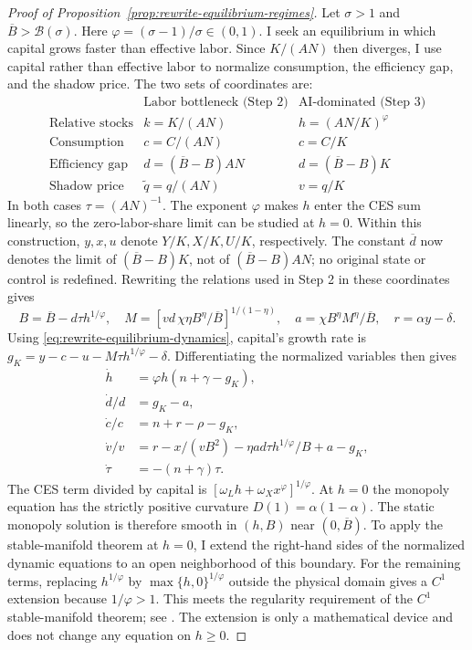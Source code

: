 \begin{proof}[Proof of Proposition~\ref{prop:rewrite-equilibrium-regimes}]
Let $\sigma>1$ and $\overline B>\mathcal B(\sigma)$.
Here $\varphi=(\sigma-1)/\sigma\in(0,1)$.
I seek an equilibrium in which capital grows faster than effective labor.
Since $K/(AN)$ then diverges, I use capital rather than effective labor
to normalize consumption, the efficiency gap, and the shadow price.
The two sets of coordinates are:
\[
\begin{array}{c|cc}
 &\text{Labor bottleneck (Step 2)}&\text{AI-dominated (Step 3)}\\
 \text{Relative stocks}&k=K/(AN)&h=(AN/K)^\varphi\\
 \text{Consumption}&c=C/(AN)&c=C/K\\
 \text{Efficiency gap}&d=(\overline B-B)AN&d=(\overline B-B)K\\
 \text{Shadow price}&\widetilde q=q/(AN)&v=q/K
\end{array}
\]
In both cases $\tau=(AN)^{-1}$.
The exponent $\varphi$ makes $h$ enter the CES sum linearly, so the
zero-labor-share limit can be studied at $h=0$.
Within this construction, $y,x,u$ denote $Y/K,X/K,U/K$, respectively.
The constant $\overline d$ now denotes the limit of $(\overline B-B)K$,
not of $(\overline B-B)AN$; no original state or control is redefined.
Rewriting the relations used in Step 2 in these coordinates gives
\[
 B=\overline B-d\tau h^{1/\varphi},\quad
 M=\left[vd\,\chi\eta B^\eta/\overline B\right]^{1/(1-\eta)},\quad
 a=\chi B^\eta M^\eta/\overline B,\quad r=\alpha y-\delta.
\]
Using \eqref{eq:rewrite-equilibrium-dynamics}, capital's growth rate is
$g_K=y-c-u-M\tau h^{1/\varphi}-\delta$.
Differentiating the normalized variables then gives
\begin{subequations}
\label{eq:rewrite-ai-proof-dynamics}
\begin{align}
 \dot h&=\varphi h(n+\gamma-g_K),\\
 \dot d/d&=g_K-a,\\
 \dot c/c&=n+r-\rho-g_K,\\
 \dot v/v&=r-x/(vB^2)-\eta ad\tau h^{1/\varphi}/B+a-g_K,\\
 \dot\tau&=-(n+\gamma)\tau.
\end{align}
\end{subequations}
The CES term divided by capital is
$[\omega_Lh+\omega_Xx^\varphi]^{1/\varphi}$.
At $h=0$ the monopoly equation has the strictly positive curvature
$D(1)=\alpha(1-\alpha)$. The static monopoly solution is therefore smooth
in $(h,B)$ near $(0,\overline B)$. To apply the stable-manifold theorem at
$h=0$, I extend the right-hand sides of the normalized dynamic equations
to an open neighborhood of this boundary.
For the remaining terms, replacing
$h^{1/\varphi}$ by $\max\{h,0\}^{1/\varphi}$ outside the physical domain
gives a $C^1$ extension because $1/\varphi>1$. This meets the regularity
requirement of the $C^1$ stable-manifold theorem; see
\citet[p.~7]{feldman2021stable}. The extension is only a
mathematical device and does not change any equation on $h\geq0$.


\end{proof}
